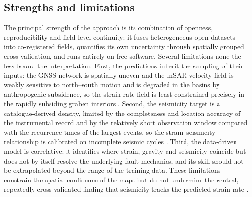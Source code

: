 \documentclass[pdflatex,sn-mathphys-num]{sn-jnl}%
\theoremstyle{thmstyleone}%
\theoremstyle{thmstyletwo}%
\theoremstyle{thmstylethree}%
\begin{document}
\subsection{Strengths and limitations}\label{sec:limits}
The principal strength of the approach is its combination of openness, reproducibility
and field-level continuity: it fuses heterogeneous open datasets into co-registered
fields, quantifies its own uncertainty through spatially grouped cross-validation, and
runs entirely on free software. Several limitations none the less bound the
interpretation. First, the predictions inherit the sampling of their inputs: the GNSS
network is spatially uneven and the InSAR velocity field is weakly sensitive to
north--south motion and is degraded in the basins by anthropogenic subsidence, so the
strain-rate field is least constrained precisely in the rapidly subsiding graben
interiors \cite{Wright2004,Diercks2024,Dogan2022,Imamoglu2022}. Second, the seismicity target is a
catalogue-derived density, limited by the completeness and location accuracy of the
instrumental record and by the relatively short observation window compared with the
recurrence times of the largest events, so the strain--seismicity relationship is
calibrated on incomplete seismic cycles \cite{Storchak2013,Mozafari2022,EyidoganJackson1985}.
Third, the data-driven model is correlative: it identifies where strain, gravity and
seismicity coincide but does not by itself resolve the underlying fault mechanics, and
its skill should not be extrapolated beyond the range of the training data. These
limitations constrain the spatial confidence of the maps but do not undermine the
central, repeatedly cross-validated finding that seismicity tracks the predicted strain
rate \cite{Pedregosa2011,Reichstein2019,Lemenkova202316,Bergen2019,MousaviBeroza2023}.
\end{document}

